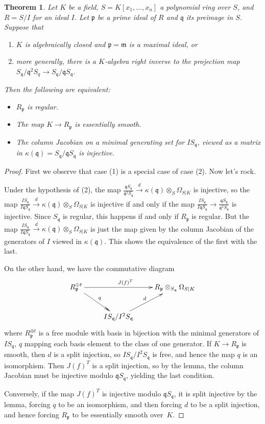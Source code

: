 \documentclass{amsart}[12pt]
\newcommand{\fp}{{\mathfrak p}}
\newcommand{\fm}{{\mathfrak m}}
\newcommand{\fq}{{\mathfrak q}}
\numberwithin{equation}{section}
\theoremstyle{plain} %
\newtheorem{thm}[equation]{Theorem}
\theoremstyle{definition}
\theoremstyle{remark}
\newcommand{\xra}[1]{\xrightarrow{#1}}
\begin{document}
\begin{thm}
Let $K$ be a field, $S=K[x_1,\dots,x_n]$ a polynomial ring over $S$, and $R=S/I$ for an ideal $I$. Let $\fp$ be a prime ideal of $R$ and $\fq$ its preimage in $S$. Suppose that
\begin{enumerate}
\item $K$ is algebraically closed and $\fp=\fm$ is a maximal ideal, or
\item more generally, there is a $K$-algebra right inverse to the projection map $S_\fq / \fq^2 S_q \to S_\fq / \fq S_\fq$.
\end{enumerate}
Then the following are equivalent:
\begin{itemize}
\item $R_\fp$ is regular.
\item The map $K \to R_\fp$ is essentially smooth.
\item The column Jacobian on a minimal generating set for $IS_{\fq}$, viewed as a matrix in $\kappa(\fq)=S_\fq/\fq S_\fq$ is injective.
\end{itemize}
\end{thm}
\begin{proof}
First we observe that case (1) is a special case of case (2). Now let's rock.

Under the hypothesis of (2), the map $\frac{\fq S_\fq}{\fq^2 S_\fq} \xra{d} \kappa(\fq) \otimes_S \Omega_{S|K}$ is injective, so the map  $\frac{I S_\fq}{ I \fq S_\fq} \xra{d} \kappa(\fq) \otimes_S \Omega_{S|K}$  is injective if and only if the map $\frac{I S_\fq}{ I \fq S_\fq} \to \frac{\fq S_\fq}{\fq^2 S_\fq}$ is injective. Since $S_\fq$ is regular, this happens if and only if $R_\fp$ is regular. But the map $\frac{I S_\fq}{I \fq S_\fq} \xra{d} \kappa(\fq) \otimes_S \Omega_{S|K}$ is just the map given by the column Jacobian of the generators of $I$ viewed in $\kappa(\fq)$. This shows the equivalence of the first with the last.

On the other hand, we have the commutative diagram
\[ \xymatrix{ R_{\fp}^{\oplus t} \ar[rr]^{J(f)^T} \ar@{->>}[dr]^q && R_\fp \otimes_{S_{\fq}} \Omega_{S|K} \\ &
I S_{\fq} / I^2 S_{\fq} \ar[ur]^{d} &}\]
where $R_{\fp}^{\oplus t}$ is a free module with basis in bijection with the minimal generators of $IS_{\fq}$, $q$ mapping each basis element to the class of one generator.
If $K\to R_{\fp}$ is smooth, then $d$ is a split injection, so $I S_{\fq} / I^2 S_{\fq}$ is free, and hence the map $q$ is an isomorphism. Then $J(f)^T$ is a split injection, so by the lemma, the column Jacobian must be injective modulo $\fq S_{\fq}$, yielding the last condition.

Conversely, if the map $J(f)^T$ is injective modulo $\fq S_{\fq}$, it is split injective by the lemma, forcing $q$ to be an isomorphism, and then forcing $d$ to be a split injection, and hence forcing $R_\fp$ to be essentially smooth over~$K$.\end{proof}
\end{document}
